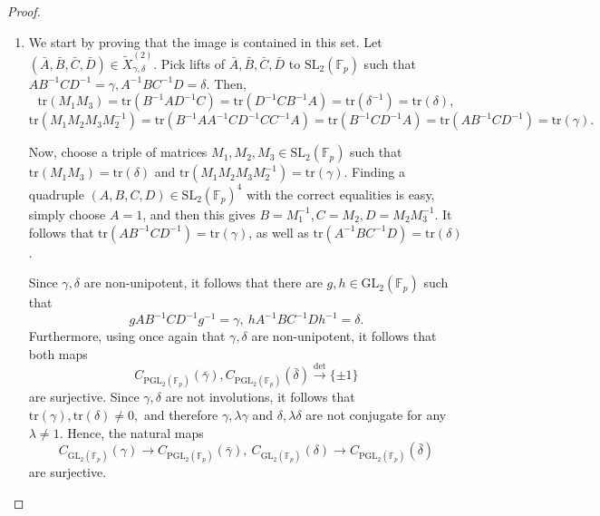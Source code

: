 \documentclass[letterpaper]{amsart}
\begin{document}
\begin{proof}
\begin{enumerate}
    Denote by $k \in \Gamma$ the element such that $A_2=kA_1$. It follows that $(A_2,B_2,C_2,D_2)=k(A_1,B_1,C_1,D_1)$. On the other hand, $A_1B_1^{-1}C_1D_1^{-1}=\gamma=A_2B_2^{-1}C_2D_2^{-1}$, and so $k \in C_\Gamma(\gamma)$. Therefore the points are equal in $X_{\gamma,\delta}^{(2)}.$

    \item We start by proving that the image is contained in this set. Let $(\bar{A}, \bar{B}, \bar{C}, \bar{D}) \in \tilde{X}_{\gamma, \delta}^{(2)}.$ Pick lifts of $\bar{A}, \bar{B}, \bar{C}, \bar{D}$ to $\mathrm{SL}_2(\mathbb{F}_p)$ such that $AB^{-1}CD^{-1} = \gamma, A^{-1}BC^{-1}D = \delta.$ Then, 
    $$\mathrm{tr}(M_1M_3)=\mathrm{tr}(B^{-1}AD^{-1}C)=\mathrm{tr}(D^{-1}CB^{-1}A)=\mathrm{tr}(\delta^{-1})=\mathrm{tr}(\delta),$$
    $$\mathrm{tr}(M_1M_2M_3M_2^{-1}) = \mathrm{tr}(B^{-1}AA^{-1}CD^{-1}CC^{-1}A)=\mathrm{tr}(B^{-1}CD^{-1}A)=\mathrm{tr}(AB^{-1}CD^{-1})=\mathrm{tr}(\gamma).$$

    Now, choose a triple of matrices $M_1,M_2,M_3 \in \mathrm{SL}_2(\mathbb{F}_p)$ such that $\mathrm{tr}(M_1M_3)=\mathrm{tr}(\delta)$ and $\mathrm{tr}(M_1M_2M_3M_2^{-1})=\mathrm{tr}(\gamma)$.
    Finding a quadruple $(A,B,C,D) \in \mathrm{SL}_2(\mathbb{F}_p)^4$ with the correct equalities is easy, simply choose $A = 1$, and then this gives $B = M_1^{-1},C=M_2,D=M_2M_3^{-1}$. It follows that $\mathrm{tr}(AB^{-1}CD^{-1})=\mathrm{tr}(\gamma)$, as well as $\mathrm{tr}(A^{-1}BC^{-1}D)=\mathrm{tr}(\delta)$.
    
    Since $\gamma,\delta$ are non-unipotent, it follows that there are $g,h\in \mathrm{GL}_2(\mathbb{F}_p)$ such that
    $$g AB^{-1}CD^{-1} g^{-1} = \gamma,\ hA^{-1}BC^{-1}Dh^{-1} = \delta.$$
    Furthermore, using once again that $\gamma, \delta$ are non-unipotent, it follows that both maps
    $$C_{\mathrm{PGL}_2(\mathbb{F}_p)}(\bar{\gamma}), C_{\mathrm{PGL}_2(\mathbb{F}_p)}(\bar{\delta}) \overset{\det}{\longrightarrow} \{\pm 1\}$$
    are surjective. Since $\gamma, \delta$ are not involutions, it follows that $\mathrm{tr}(\gamma), \mathrm{tr}(\delta) \neq 0,$ and therefore $\gamma, \lambda\gamma$ and $\delta, \lambda\delta$ are not conjugate for any $\lambda \neq 1.$ Hence, the natural maps $$C_{\mathrm{GL}_2(\mathbb{F}_p)}(\gamma) \to C_{\mathrm{PGL}_2(\mathbb{F}_p)}(\bar{\gamma}),\ C_{\mathrm{GL}_2(\mathbb{F}_p)}(\delta) \to C_{\mathrm{PGL}_2(\mathbb{F}_p)}(\bar{\delta})$$ are surjective.


\end{enumerate}
\end{proof}
\end{document}

